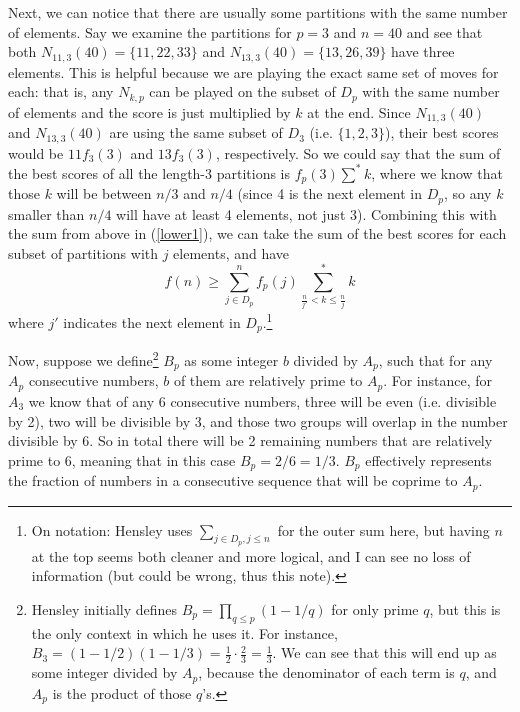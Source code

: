 \documentclass[a4paper,10pt]{amsart} %
\begin{document}
Next, we can notice that there are usually some partitions with the same number of elements. Say we examine the partitions for $p = 3$ and $n = 40$ and see that both $N_{11,3} (40) = \{11, 22, 33 \}$ and $N_{13, 3} (40) = \{13, 26, 39 \}$ have three elements. This is helpful because we are playing the exact same set of moves for each: that is, any $N_{k,p}$ can be played on the subset of $D_p$ with the same number of elements and the score is just multiplied by $k$ at the end. Since $N_{11,3} (40)$ and $N_{13,3} (40)$ are using the same subset of $D_3$ (i.e. $\{1,2,3 \}$), their best scores would be $11f_3 (3)$ and $13 f_3 (3)$, respectively. So we could say that the sum of the best scores of all the length-3 partitions is $f_p(3) \sum^* k$, where we know that those $k$ will be between $n/3$ and $n/4$ (since 4 is the next element in $D_p$, so any $k$ smaller than $n / 4$ will have at least 4 elements, not just 3). Combining this with the sum from above in (\ref{lower1}), we can take the sum of the best scores for each subset of partitions with $j$ elements, and have
\begin{equation} \label{lower2}
    f(n) \geq \sum_{j \in D_p}^n f_p(j) \sum_{\frac{n}{j'} < k \leq \frac{n}{j}}^* k
\end{equation}
where $j'$ indicates the next element in $D_p$.\footnote{On notation: Hensley uses $\sum_{j\in D_p, j \leq n}$ for the outer sum here, but having $n$ at the top seems both cleaner and more logical, and I can see no loss of information (but could be wrong, thus this note).} 

Now, suppose we define\footnote{Hensley initially defines $B_p = \prod_{q\leq p} (1 - 1/q)$ for only prime $q$, but this is the only context in which he uses it. For instance, $B_3 = (1 - 1/2)(1 - 1/3) = \frac{1}{2}\cdot \frac{2}{3} = \frac{1}{3}$. We can see that this will end up as some integer divided by $A_p$, because the denominator of each term is $q$, and $A_p$ is the product of those $q$'s.} $B_p$ as some integer $b$ divided by $A_p$, such that for any $A_p$ consecutive numbers, $b$ of them are relatively prime to $A_p$. For  instance, for $A_3$ we know that of any 6 consecutive numbers, three will be even (i.e. divisible by 2), two will be divisible by 3, and those two groups will overlap in the number divisible by 6. So in total there will be 2 remaining numbers that are relatively prime to 6, meaning that in this case $B_p = 2/6 = 1/3$. $B_p$ effectively represents the fraction of numbers in a consecutive sequence that will be coprime to $A_p$. 
\end{document}
